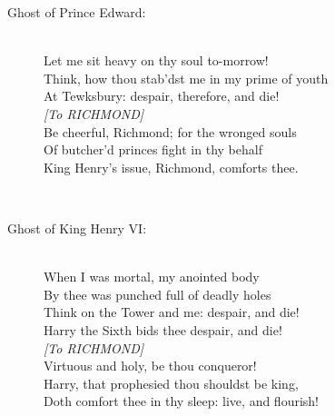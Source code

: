 \documentclass{article}
\begin{document}
\begin{description}
\item[Ghost of Prince Edward:] 
\hspace{1pt}\\
\hspace{1pt}Let me sit heavy on thy soul to-morrow!\\
\hspace{1pt}Think, how thou stab'dst me in my prime of youth\\
\hspace{1pt}At Tewksbury: despair, therefore, and die!\\
{\it [To RICHMOND]}\\
\hspace{1pt}Be cheerful, Richmond; for the wronged souls\\
\hspace{1pt}Of butcher'd princes fight in thy behalf\\
\hspace{1pt}King Henry's issue, Richmond, comforts thee.\\
\end{description}
\\
\begin{description}
\item[Ghost of King Henry VI:] 
\hspace{1pt}\\
\hspace{1pt}When I was mortal, my anointed body\\
\hspace{1pt}By thee was punched full of deadly holes\\
\hspace{1pt}Think on the Tower and me: despair, and die!\\
\hspace{1pt}Harry the Sixth bids thee despair, and die!\\
{\it [To RICHMOND]}\\
\hspace{1pt}Virtuous and holy, be thou conqueror!\\
\hspace{1pt}Harry, that prophesied thou shouldst be king,\\
\hspace{1pt}Doth comfort thee in thy sleep: live, and flourish!\\
\end{description}
\\
\end{document}
